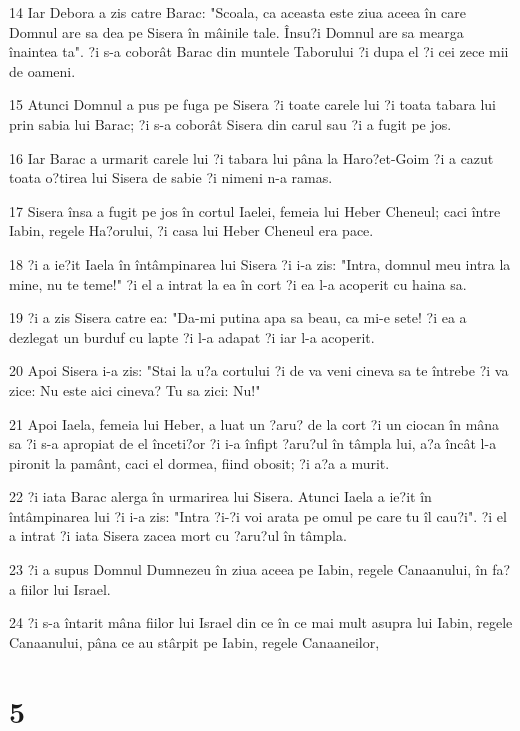 \par 14 Iar Debora a zis catre Barac: "Scoala, ca aceasta este ziua aceea în care Domnul are sa dea pe Sisera în mâinile tale. Însu?i Domnul are sa mearga înaintea ta". ?i s-a coborât Barac din muntele Taborului ?i dupa el ?i cei zece mii de oameni.
\par 15 Atunci Domnul a pus pe fuga pe Sisera ?i toate carele lui ?i toata tabara lui prin sabia lui Barac; ?i s-a coborât Sisera din carul sau ?i a fugit pe jos.
\par 16 Iar Barac a urmarit carele lui ?i tabara lui pâna la Haro?et-Goim ?i a cazut toata o?tirea lui Sisera de sabie ?i nimeni n-a ramas.
\par 17 Sisera însa a fugit pe jos în cortul Iaelei, femeia lui Heber Cheneul; caci între Iabin, regele Ha?orului, ?i casa lui Heber Cheneul era pace.
\par 18 ?i a ie?it Iaela în întâmpinarea lui Sisera ?i i-a zis: "Intra, domnul meu intra la mine, nu te teme!" ?i el a intrat la ea în cort ?i ea l-a acoperit cu haina sa.
\par 19 ?i a zis Sisera catre ea: "Da-mi putina apa sa beau, ca mi-e sete! ?i ea a dezlegat un burduf cu lapte ?i l-a adapat ?i iar l-a acoperit.
\par 20 Apoi Sisera i-a zis: "Stai la u?a cortului ?i de va veni cineva sa te întrebe ?i va zice: Nu este aici cineva? Tu sa zici: Nu!"
\par 21 Apoi Iaela, femeia lui Heber, a luat un ?aru? de la cort ?i un ciocan în mâna sa ?i s-a apropiat de el înceti?or ?i i-a înfipt ?aru?ul în tâmpla lui, a?a încât l-a pironit la pamânt, caci el dormea, fiind obosit; ?i a?a a murit.
\par 22 ?i iata Barac alerga în urmarirea lui Sisera. Atunci Iaela a ie?it în întâmpinarea lui ?i i-a zis: "Intra ?i-?i voi arata pe omul pe care tu îl cau?i". ?i el a intrat ?i iata Sisera zacea mort cu ?aru?ul în tâmpla.
\par 23 ?i a supus Domnul Dumnezeu în ziua aceea pe Iabin, regele Canaanului, în fa?a fiilor lui Israel.
\par 24 ?i s-a întarit mâna fiilor lui Israel din ce în ce mai mult asupra lui Iabin, regele Canaanului, pâna ce au stârpit pe Iabin, regele Canaaneilor,

\chapter{5}

